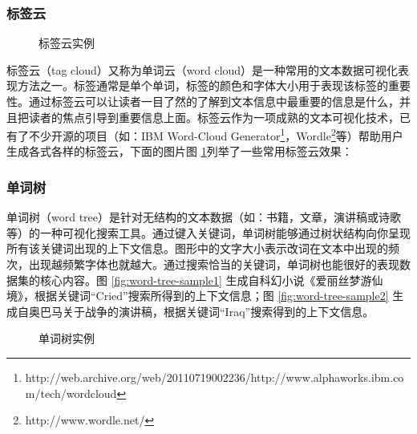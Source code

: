 \subsubsection{标签云}
\begin{figure}[htb]
    \centering
    \caption{标签云实例}
    \label{fig:tag-cloud}
\end{figure}
标签云（tag cloud）又称为单词云（word cloud）是一种常用的文本数据可视化表现方法之一。标签通常是单个单词，标签的颜色和字体大小用于表现该标签的重要性。通过标签云可以让读者一目了然的了解到文本信息中最重要的信息是什么，并且把读者的焦点引导到重要信息上面。标签云作为一项成熟的文本可视化技术，已有了不少开源的项目（如：IBM Word-Cloud Generator\footnote{http://web.archive.org/web/20110719002236/http://www.alphaworks.ibm.com/tech/wordcloud}，Wordle\footnote{http://www.wordle.net/}等）帮助用户生成各式各样的标签云，下面的图片图 \ref{fig:tag-cloud}列举了一些常用标签云效果：

\subsubsection{单词树}
单词树（word tree）\cite{Wattenberg2008}是针对无结构的文本数据（如：书籍，文章，演讲稿或诗歌等）的一种可视化搜索工具。通过键入关键词，单词树能够通过树状结构向你呈现所有该关键词出现的上下文信息。图形中的文字大小表示改词在文本中出现的频次，出现越频繁字体也就越大。通过搜索恰当的关键词，单词树也能很好的表现数据集的核心内容。图 \ref{fig:word-tree-sample1} 生成自科幻小说《爱丽丝梦游仙境》，根据关键词“Cried”搜索所得到的上下文信息；图 \ref{fig:word-tree-sample2} 生成自奥巴马关于战争的演讲稿，根据关键词“Iraq”搜索得到的上下文信息。 
\begin{figure}[htb]
    \centering
    \caption{单词树实例}
    \label{fig:word-tree}
\end{figure}

